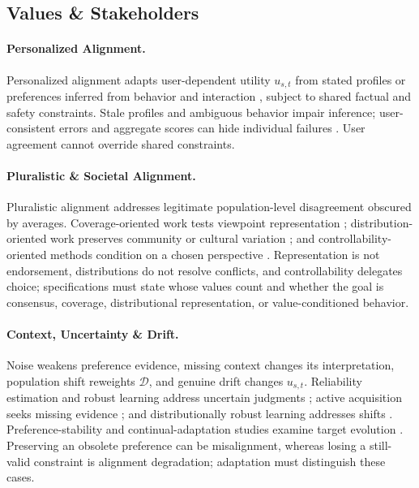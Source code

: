 \documentclass[11pt]{article}
\begin{document}
\subsection{Values \& Stakeholders}
\label{subsec:values-stakeholders}

\paragraph{Personalized Alignment.}
Personalized alignment adapts user-dependent utility \(u_{s,t}\) from stated profiles or preferences inferred from behavior and interaction \citep{bu2025cope,kim2025drift,wu2025interaction,balepur2025personas}, subject to shared factual and safety constraints. Stale profiles and ambiguous behavior impair inference; user-consistent errors and aggregate scores can hide individual failures \citep{sun2026fpps,garbacea2026personalizedbenchmark}. User agreement cannot override shared constraints.

\paragraph{Pluralistic \& Societal Alignment.}
Pluralistic alignment addresses legitimate population-level disagreement obscured by averages. Coverage-oriented work tests viewpoint representation \citep{pooledayan2026overtonbench,nie2026perspectra}; distribution-oriented work preserves community or cultural variation \citep{zhang2026cultivating,sun2026cuma}; and controllability-oriented methods condition on a chosen perspective \citep{zhou2026disalign,kim2026valueflow}. Representation is not endorsement, distributions do not resolve conflicts, and controllability delegates choice; specifications must state whose values count and whether the goal is consensus, coverage, distributional representation, or value-conditioned behavior.

\paragraph{Context, Uncertainty \& Drift.}
Noise weakens preference evidence, missing context changes its interpretation, population shift reweights \(\mathcal{D}\), and genuine drift changes \(u_{s,t}\). Reliability estimation and robust learning address uncertain judgments \citep{chen2026cfa,xu2026fadpo,fang2026aam}; active acquisition seeks missing evidence \citep{lin2026activedpo,feng2025pilaf}; and distributionally robust learning addresses shifts \citep{xu2025robustdpo}. Preference-stability and continual-adaptation studies examine target evolution \citep{boerstler2024stability,zhang2025copr,keswani2026moralchange}. Preserving an obsolete preference can be misalignment, whereas losing a still-valid constraint is alignment degradation; adaptation must distinguish these cases.
\end{document}

